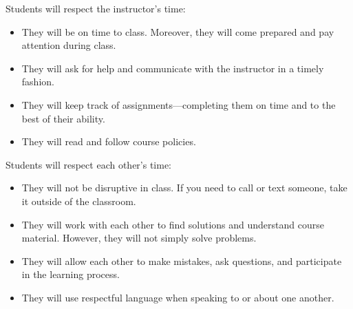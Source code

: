 \documentclass[11pt,letterpaper]{article}
\begin{document}
Students will respect the instructor's time:
	\begin{itemize}
	\item They will be on time to class. Moreover, they will come prepared and pay attention during class. 
	\item They will ask for help and communicate with the instructor in a timely fashion. 
	\item They will keep track of assignments---completing them on time and to the best of their ability.  
	\item They will read and follow course policies. 
	\end{itemize} \pspace

Students will respect each other's time:
	\begin{itemize}
	\item They will not be disruptive in class. If you need to call or text someone, take it outside of the classroom. 
	\item They will work with each other to find solutions and understand course material. However, they will not simply solve problems. 
	\item They will allow each other to make mistakes, ask questions, and participate in the learning process. 
	\item They will use respectful language when speaking to or about one another. 
	\end{itemize}
\sectionbreak



%
%
\end{document}
